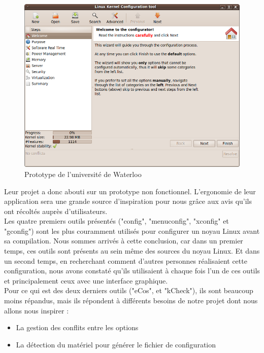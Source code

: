 \documentclass[16pts]{report}
\begin{document}
\begin{figure}[H]
    \includegraphics[scale=0.6]{illustrations/lkc_config.png}
    \centering
    \caption{Prototype de l'université de Waterloo}
    \label{fig:PrototypeWaterloo}
\end{figure}

Leur projet a donc abouti sur un prototype non fonctionnel.  L’ergonomie de
leur application sera une grande source d’inspiration pour nous grâce aux avis
qu’ils ont récoltés auprès d’utilisateurs.  \\

Les quatre premiers outils présentés ("config", "menuconfig", "xconfig" et
"gconfig") sont les plus couramment utilisés pour configurer un noyau Linux
avant sa compilation. Nous sommes arrivés à cette conclusion, car dans un
premier temps, ces outils sont présents au sein même des sources du noyau
Linux.  Et dans un second temps, en recherchant comment d'autres personnes
réalisaient cette configuration, nous avons constaté qu'ils utilisaient à
chaque fois l'un de ces outils et principalement ceux avec une interface
graphique.  \\

Pour ce qui est des deux derniers outils ("eCos", et "kCheck"), ils sont
beaucoup moins répandus, mais ils répondent à différents besoins de notre projet
dont nous allons nous inspirer :
\begin{itemize}
    \item La gestion des conflits entre les options
    \item La détection du matériel pour générer le fichier de configuration
\end{itemize}
\end{document}
